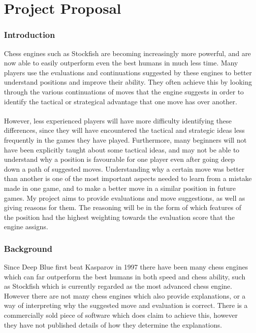 \documentclass[12pt,a4paper]{article}
\begin{document}
\part*{Project Proposal}
\section*{Introduction}
Chess engines such as Stockfish are becoming increasingly more powerful, and are now able to easily outperform even the best humans in much less time. Many players use the evaluations and continuations suggested by these engines to better understand positions and improve their ability. They often achieve this by looking through the various continuations of moves that the engine suggests in order to identify the tactical or strategical advantage that one move has over another.
\\\\
However, less experienced players will have more difficulty identifying these differences, since they will have encountered the tactical and strategic ideas less frequently in the games they have played. Furthermore, many beginners will not have been explicitly taught about some tactical ideas, and may not be able to understand why a position is favourable for one player even after going deep down a path of suggested moves. Understanding why a certain move was better than another is one of the most important aspects needed to learn from a mistake made in one game, and to make a better move in a similar position in future games. My project aims to provide evaluations and move suggestions, as well as giving reasons for them. The reasoning will be in the form of which features of the position had the highest weighting towards the evaluation score that the engine assigns.

\section*{Background}
Since Deep Blue first beat Kasparov in 1997 there have been many chess engines which can far outperform the best humans in both speed and chess ability, such as Stockfish which is currently regarded as the most advanced chess engine. However there are not many chess engines which also provide explanations, or a way of interpreting why the suggested move and evaluation is correct. There is a commercially sold piece of software which does claim to achieve this, however they have not published details of how they determine the explanations.
\end{document}
